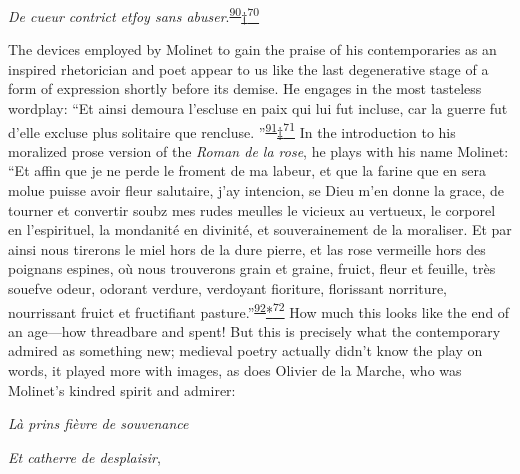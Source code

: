 \emph{De cueur contrict etfoy sans
abuser}.\textsuperscript{\protect\hypertarget{21_Chapter_Thirteen__IMAGE_AND_WORD.xhtmlux5cux23id_132}{\protect\hyperlink{23_NOTES.xhtmlux5cux23id_133}{90}}}\protect\hypertarget{21_Chapter_Thirteen__IMAGE_AND_WORD.xhtmlux5cux23id_2813}{\protect\hyperlink{23_NOTES.xhtmlux5cux23id_2814}{†\textsuperscript{70}}}

The devices employed by Molinet to gain the praise of his contemporaries
as an inspired rhetorician and poet appear to us like the last
degenerative stage of a form of expression shortly before its demise. He
engages in the most tasteless wordplay: ``Et ainsi demoura l'escluse en
paix qui lui fut incluse, car la guerre fut d'elle excluse plus
solitaire que rencluse.
''\textsuperscript{\protect\hypertarget{21_Chapter_Thirteen__IMAGE_AND_WORD.xhtmlux5cux23id_130}{\protect\hyperlink{23_NOTES.xhtmlux5cux23id_131}{91}}}\protect\hypertarget{21_Chapter_Thirteen__IMAGE_AND_WORD.xhtmlux5cux23id_2811}{\protect\hyperlink{23_NOTES.xhtmlux5cux23id_2812}{‡\textsuperscript{71}}}
In the introduction to his moralized prose version of the \emph{Roman de
la rose}, he plays with his name Molinet: ``Et affin que je ne perde le
froment de ma labeur, et que la farine que en sera molue puisse avoir
fleur salutaire, j'ay intencion, se Dieu m'en donne la grace, de tourner
et convertir soubz mes rudes meulles le vicieux au vertueux, le corporel
en l'espirituel, la mondanité en divinité, et souverainement de la
moraliser. Et par ainsi nous tirerons le miel hors de la dure pierre, et
las rose vermeille hors des poignans espines, où nous trouverons grain
et graine, fruict, fleur et feuille, très souefve odeur, odorant
verdure, verdoyant fioriture, florissant norriture, nourrissant fruict
et
fruc\protect\hypertarget{21_Chapter_Thirteen__IMAGE_AND_WORD.xhtmlux5cux23page_381}{}{}tifiant
pasture.''\textsuperscript{\protect\hypertarget{21_Chapter_Thirteen__IMAGE_AND_WORD.xhtmlux5cux23id_128}{\protect\hyperlink{23_NOTES.xhtmlux5cux23id_129}{92}}}\protect\hypertarget{21_Chapter_Thirteen__IMAGE_AND_WORD.xhtmlux5cux23id_2809}{\protect\hyperlink{23_NOTES.xhtmlux5cux23id_2810}{*\textsuperscript{72}}}
How much this looks like the end of an age---how threadbare and spent!
But this is precisely what the contemporary admired as something new;
medieval poetry actually didn't know the play on words, it played more
with images, as does Olivier de la Marche, who was Molinet's kindred
spirit and admirer:

\emph{Là prins fièvre de souvenance}

\emph{Et catherre de desplaisir},

